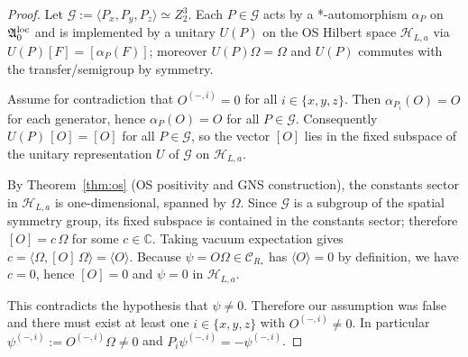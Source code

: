 \documentclass[11pt]{amsart}
\theoremstyle{plain}
\theoremstyle{definition}
\theoremstyle{remark}
\begin{document}
\begin{proof}
Let $\mathcal{G}:=\langle P_x,P_y,P_z\rangle\simeq Z_2^3$. Each $P\in\mathcal{G}$ acts by a *-automorphism $\alpha_P$ on $\mathfrak{A}_0^{\rm loc}$ and is implemented by a unitary $U(P)$ on the OS Hilbert space $\mathcal{H}_{L,a}$ via $U(P)[F]=[\alpha_P(F)]$; moreover $U(P)\Omega=\Omega$ and $U(P)$ commutes with the transfer/semigroup by symmetry.

Assume for contradiction that $O^{(-,i)}=0$ for all $i\in\{x,y,z\}$. Then $\alpha_{P_i}(O)=O$ for each generator, hence $\alpha_P(O)=O$ for all $P\in\mathcal{G}$. Consequently $U(P)\,[O]=[O]$ for all $P\in\mathcal{G}$, so the vector $[O]$ lies in the fixed subspace of the unitary representation $U$ of $\mathcal{G}$ on $\mathcal{H}_{L,a}$.

By Theorem~\ref{thm:os} (OS positivity and GNS construction), the constants sector in $\mathcal{H}_{L,a}$ is one-dimensional, spanned by $\Omega$. Since $\mathcal{G}$ is a subgroup of the spatial symmetry group, its fixed subspace is contained in the constants sector; therefore $[O]=c\,\Omega$ for some $c\in\mathbb{C}$. Taking vacuum expectation gives $c=\langle\Omega,[O]\,\Omega\rangle=\langle O\rangle$. Because $\psi=O\Omega\in\mathcal{C}_{R_*}$ has $\langle O\rangle=0$ by definition, we have $c=0$, hence $[O]=0$ and $\psi=0$ in $\mathcal{H}_{L,a}$.

This contradicts the hypothesis that $\psi\ne 0$. Therefore our assumption was false and there must exist at least one $i\in\{x,y,z\}$ with $O^{(-,i)}\ne 0$. In particular $\psi^{(-,i)}:=O^{(-,i)}\Omega\ne 0$ and $P_i\psi^{(-,i)}=-\psi^{(-,i)}$.
\end{proof}
\end{document}
